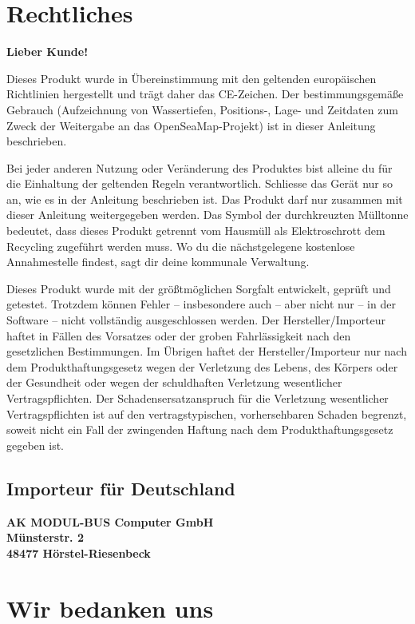 \documentclass[pdftex, fontsize=8pt, paper=130mm:92mm,pagesize]{scrartcl}
\let\stdsection\section
\renewcommand\section{\newpage\stdsection}
\begin{document}
\section{Rechtliches}
\textbf{\large{Lieber Kunde!}}\normalsize

Dieses Produkt wurde in Übereinstimmung mit den geltenden europäischen Richtlinien hergestellt und trägt daher das CE-Zeichen. Der bestimmungsgemäße Gebrauch (Aufzeichnung von Wassertiefen, Positions-, Lage- und Zeitdaten zum Zweck der Weitergabe an das OpenSeaMap-Projekt) ist in dieser Anleitung beschrieben.

Bei jeder anderen Nutzung oder Veränderung des Produktes bist alleine du für die Einhaltung der geltenden Regeln verantwortlich. Schliesse das Gerät nur so an, wie es in der Anleitung beschrieben ist. Das Produkt darf nur zusammen mit dieser Anleitung weitergegeben werden. Das Symbol der durchkreuzten Mülltonne bedeutet, dass dieses Produkt getrennt vom Hausmüll als Elektroschrott dem Recycling zugeführt werden muss. Wo du die nächstgelegene kostenlose Annahmestelle findest, sagt dir deine kommunale Verwaltung.

Dieses Produkt wurde mit der größtmöglichen Sorgfalt entwickelt, geprüft und getestet. Trotzdem können Fehler – insbesondere auch – aber nicht nur – in der Software – nicht vollständig ausgeschlossen werden. Der Hersteller/Importeur haftet in Fällen des Vorsatzes oder der groben Fahrlässigkeit nach den gesetzlichen Bestimmungen. Im Übrigen haftet der Hersteller/Importeur nur nach dem Produkthaftungsgesetz wegen der Verletzung des Lebens, des Körpers oder der Gesundheit oder wegen der schuldhaften Verletzung wesentlicher Vertragspflichten. Der Schadensersatzanspruch für die Verletzung wesentlicher Vertragspflichten ist auf den vertragstypischen, vorhersehbaren Schaden begrenzt, soweit nicht ein Fall der zwingenden Haftung nach dem Produkthaftungsgesetz gegeben ist.



\subsection{Importeur für Deutschland}
\textbf{AK MODUL-BUS Computer GmbH\\
Münsterstr. 2\\
48477 Hörstel-Riesenbeck }

\section{Wir bedanken uns}
\end{document}
